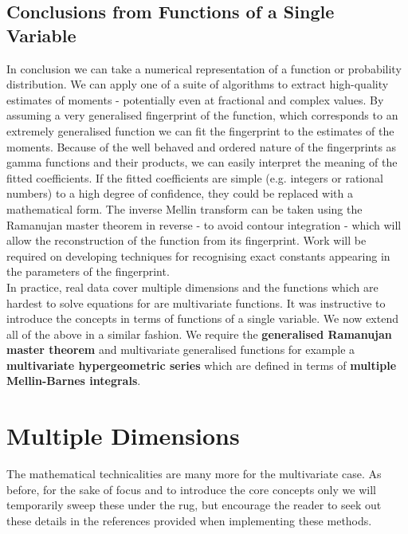 \documentclass{article}
\begin{document}
\subsection{Conclusions from Functions of a Single Variable}
In conclusion we can take a numerical representation of a function or probability distribution. We can apply one of a suite of algorithms to extract high-quality estimates of moments - potentially even at fractional and complex values. By assuming a very generalised fingerprint of the function, which corresponds to an extremely generalised function we can fit the fingerprint to the estimates of the moments. Because of the well behaved and ordered nature of the fingerprints as gamma functions and their products, we can easily interpret the meaning of the fitted coefficients. If the fitted coefficients are simple (e.g. integers or rational numbers) to a high degree of confidence, they could be replaced with a mathematical form. The inverse Mellin transform can be taken using the Ramanujan master theorem in reverse - to avoid contour integration - which will allow the reconstruction of the function from its fingerprint. Work will be required on developing techniques for recognising exact constants appearing in the parameters of the fingerprint. \\

In practice, real data cover multiple dimensions and the functions which are hardest to solve equations for are multivariate functions. It was instructive to introduce the concepts in terms of functions of a single variable.  We now extend all of the above in a similar fashion. We require the \textbf{generalised Ramanujan master theorem} and multivariate generalised functions for example a \textbf{multivariate hypergeometric series} which are defined in terms of \textbf{multiple Mellin-Barnes integrals}. 

\section{Multiple Dimensions}
The mathematical technicalities are many more for the multivariate case. As before, for the sake of focus and to introduce the core concepts only we will temporarily sweep these under the rug, but encourage the reader to seek out these details in the references provided when implementing these methods. 
\end{document}
